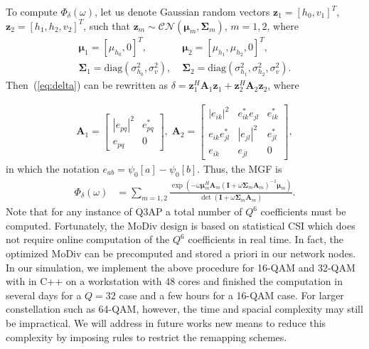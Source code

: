 \documentclass[journal,draftcls,onecolumn,12pt,twoside]{IEEEtran}
\begin{document}
To compute $\Phi_{\delta}(\omega)$, let us denote Gaussian random vectors
$\mathbf{z}_1 = [h_0, v_1]^T$, $\mathbf{z}_{2} = [h_1, h_2, v_2]^T$, such
that $\mathbf{z}_m\sim\mathcal{CN}(\bm{\mu}_m, \mathbf{\Sigma}_m)$, $m=1,2$,
where
\begin{align}
    \bm{\mu}_1 = [\mu_{h_0}, 0]^T,& \; \bm{\mu}_{2} = [\mu_{h_1}, \mu_{h_2},
    0]^T,
    \\
    \mathbf{\Sigma}_1 = \mbox{diag}\left(\sigma_{h_0}^2, \sigma_v^2\right), & \;
    \mathbf{\Sigma}_2 = \mbox{diag}\left(\sigma_{h_1}^2, \sigma_{h_2}^2,
    \sigma_v^2\right).
\end{align}
Then~(\ref{eq:delta}) can be rewritten as $\delta =
\mathbf{z}_1^H\mathbf{A}_1\mathbf{z}_1 +
\mathbf{z}_{2}^H\mathbf{A}_{2}\mathbf{z}_{2}$, where

\begin{align}
    \mathbf{A}_1 = \left[
        \begin{array}{cc}
            |e_{pq}|^2  & e_{pq}^* \\
            e_{pq} & 0
        \end{array}
    \right], \;
    \mathbf{A}_2 = \left[
        \begin{array}{ccc}
        |e_{ik}|^2 & e_{ik}^*e_{jl} & e_{ik}^*
        \\
        e_{ik}e_{jl}^* & |e_{jl}|^2 & e_{jl}^*
        \\
        e_{ik} & e_{jl} & 0
    \end{array}
    \right],
\end{align}
in which the notation $e_{ab} = \psi_0[a] - \psi_0[b]$. Thus, the MGF is
\begin{align}
    \Phi_{\delta}(\omega) & = \sum_{m=1,2}
    \frac{\exp(-\omega\bm{\mu}_m^H\mathbf{A}_m(\mathbf{I} +
    \omega\mathbf{\Sigma}_m\mathbf{A}_m)^{-1}\bm{\mu}_m)}{\det(\mathbf{I} +
    \omega\mathbf{\Sigma}_m\mathbf{A}_m)}.
\end{align}
Note that for any instance of Q3AP a total number of $Q^6$ coefficients must be
computed. Fortunately, the MoDiv design is based on statistical CSI which does
not require online computation of the $Q^6$ coefficients in real time. In fact,
the optimized MoDiv can be precomputed and stored a priori in our network nodes.
In our simulation, we implement the above procedure for 16-QAM and 32-QAM with
in C++ on a workstation with 48 cores and finished the computation in several
days for a $Q=32$ case and a few hours for a 16-QAM case. For larger
constellation such as 64-QAM, however, the time and spacial complexity may still
be impractical. We will address in future works new means to reduce this complexity by 
imposing rules to restrict the remapping schemes.
\end{document}
